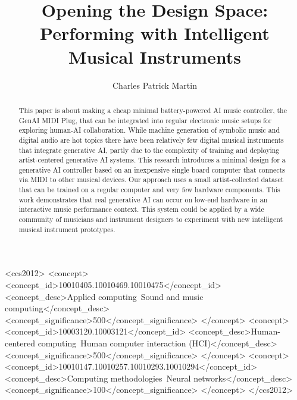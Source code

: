 \documentclass[manuscript,review,anonymous]{acmart}
\begin{document}
\title{Opening the Design Space: Performing with Intelligent Musical Instruments}


\author{Charles Patrick Martin}


\begin{abstract}
This paper is about making a cheap minimal battery-powered AI music controller, the GenAI MIDI Plug, that can be integrated into regular electronic music setups for exploring human-AI collaboration.
While machine generation of symbolic music and digital audio are hot topics there have been relatively few digital musical instruments that integrate generative AI, partly due to the complexity of training and deploying artist-centered generative AI systems.
This research introduces a minimal design for a generative AI controller based on an inexpensive single board computer that connects via MIDI to other musical devices.
Our approach uses a small artist-collected dataset that can be trained on a regular computer and very few hardware components.
This work demonstrates that real generative AI can occur on low-end hardware in an interactive music performance context. 
This system could be applied by a wide community of musicians and instrument designers to experiment with new intelligent musical instrument prototypes.
\end{abstract}


\begin{CCSXML}
<ccs2012>
   <concept>
       <concept_id>10010405.10010469.10010475</concept_id>
       <concept_desc>Applied computing~Sound and music computing</concept_desc>
       <concept_significance>500</concept_significance>
       </concept>
   <concept>
       <concept_id>10003120.10003121</concept_id>
       <concept_desc>Human-centered computing~Human computer interaction (HCI)</concept_desc>
       <concept_significance>500</concept_significance>
       </concept>
   <concept>
       <concept_id>10010147.10010257.10010293.10010294</concept_id>
       <concept_desc>Computing methodologies~Neural networks</concept_desc>
       <concept_significance>100</concept_significance>
       </concept>
 </ccs2012>
\end{CCSXML}
\end{document}
